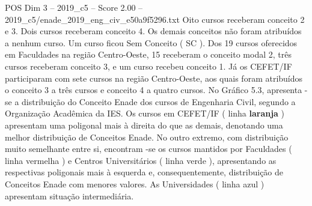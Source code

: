 \begin{textsample}{POS Dim 3 – 2019\_c5 – Score 2.00 – 2019\_c5/enade\_2019\_eng\_civ\_e50a9f5296.txt}
Oito cursos receberam conceito 2 e 3.
Dois cursos receberam conceito 4.
Os demais conceitos não foram atribuídos a nenhum curso.
Um curso ficou Sem Conceito ( SC ).
Dos 19 cursos oferecidos em Faculdades na região Centro-Oeste, 15 receberam o conceito modal 2, três cursos receberam conceito 3, e um curso recebeu conceito 1.
Já os CEFET/IF participaram com sete cursos na região Centro-Oeste, aos quais foram atribuídos o conceito 3 a três cursos e conceito 4 a quatro cursos.
No Gráfico 5.3, apresenta -se a distribuição do Conceito Enade dos cursos de Engenharia Civil, segundo a Organização Acadêmica da IES.
Os cursos em CEFET/IF ( linha \textbf{laranja} ) apresentam uma poligonal mais à direita do que as demais, denotando uma melhor distribuição de Conceitos Enade.
No outro extremo, com distribuição muito semelhante entre si, encontram -se os cursos mantidos por Faculdades ( linha vermelha ) e Centros Universitários ( linha verde ), apresentando as respectivas poligonais mais à esquerda e, consequentemente, distribuição de Conceitos Enade com menores valores.
As Universidades ( linha azul ) apresentam situação intermediária.

\end{textsample}
